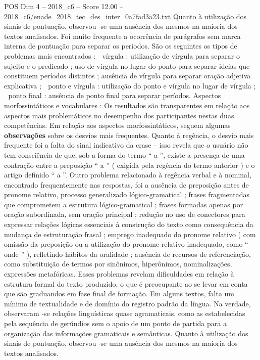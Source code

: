 \begin{textsample}{POS Dim 4 – 2018\_c6 – Score 12.00 – 2018\_c6/enade\_2018\_tec\_des\_inter\_0a7fad3a23.txt}
Quanto à utilização dos sinais de pontuação, observou -se uma ausência dos mesmos na maioria dos textos analisados.
Foi muito frequente a ocorrência de parágrafos sem marca interna de pontuação para separar os períodos.
São os seguintes os tipos de problemas mais encontrados :  vírgula : utilização de vírgula para separar o sujeito e o predicado ; uso de vírgula no lugar do ponto para separar ideias que constituem períodos distintos ; ausência de vírgula para separar oração adjetiva explicativa ;  ponto e vírgula : utilização do ponto e vírgula no lugar de vírgula ;  ponto final : ausência de ponto final para separar períodos.
Aspectos morfossintáticos e vocabulares : Os resultados são transparentes em relação aos aspectos mais problemáticos no desempenho dos participantes nestas duas competências.
Em relação aos aspectos morfossintáticos, seguem algumas \textbf{observações} sobre os desvios mais frequentes.
Quanto à regência, o desvio mais frequente foi a falta do sinal indicativo da crase – isso revela que o usuário não tem consciência de que, sob a forma do termo “ a ”, existe a presença de uma contração entre a preposição “ a ” ( exigida pela regência do termo anterior ) e o artigo definido “ a ”.
Outro problema relacionado à regência verbal e à nominal, encontrado frequentemente nas respostas, foi a ausência de preposição antes de pronome relativo, processo generalizado lógico-gramatical ; frases fragmentadas que comprometem a estrutura lógico-gramatical ; frases formadas apenas por oração subordinada, sem oração principal ; redução no uso de conectores para expressar relações lógicas essenciais à construção do texto como consequência da mudança de estruturação frasal ; emprego inadequado do pronome relativo ( com omissão da preposição ou a utilização do pronome relativo inadequado, como “ onde ” ), refletindo hábitos da oralidade ; ausência de recursos de referenciação, como substituição de termos por sinônimos, hiperônimos, nominalizações, expressões metafóricas.
Esses problemas revelam dificuldades em relação à estrutura formal do texto produzido, o que é preocupante ao se levar em conta que são graduandos em fase final de formação.
Em alguns textos, falta um mínimo de textualidade e de domínio do registro padrão da língua.
Na verdade, observaram -se relações linguísticas quase agramaticais, como as estabelecidas pela sequência de gerúndios sem o apoio de um ponto de partida para a organização das informações gramaticais e semânticas.
Quanto à utilização dos sinais de pontuação, observou -se uma ausência dos mesmos na maioria dos textos analisados.

\end{textsample}

